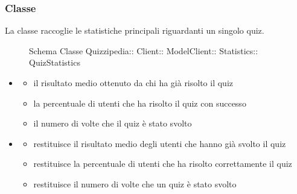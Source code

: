 \subsubsection{Classe }
La classe raccoglie le statistiche principali riguardanti un singolo quiz.
\begin{figure}[H]
\centering
\noindent{}
\caption[Schema Classe QuizStatistics]{Schema Classe Quizzipedia:: Client:: ModelClient:: Statistics:: QuizStatistics}
\end{figure}
\begin{itemize}
\item {}
\begin{itemize}
\item {}
\newline
il risultato medio ottenuto da chi ha già risolto il quiz
\item {}
\newline
la percentuale di utenti che ha risolto il quiz con successo
\item {}
\newline
il numero di volte che il quiz è stato svolto
\end{itemize}
\item {}
\begin{itemize}
\item {}
\newline
restituisce il risultato medio degli utenti che hanno già svolto il quiz
\newline
\item {}
\newline
restituisce la percentuale di utenti che ha risolto correttamente il quiz
\newline
\item {}
\newline
restituisce il numero di volte che un quiz è stato svolto
\newline
\end{itemize}
\end{itemize}
